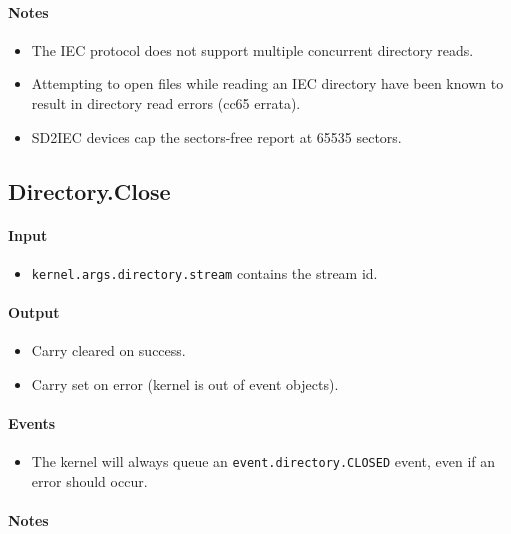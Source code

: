 \paragraph{Notes}

\begin{itemize}
\item The IEC protocol does not support multiple concurrent directory reads.
\item Attempting to open files while reading an IEC directory have been known to result in directory read errors (cc65 errata). 
\item SD2IEC devices cap the sectors-free report at 65535 sectors.
\end{itemize}


\subsection*{Directory.Close}

\paragraph{Input} 

\begin{itemize}
\item \verb+kernel.args.directory.stream+ contains the stream id.
\end{itemize}

\paragraph{Output}

\begin{itemize}
\item Carry cleared on success.
\item Carry set on error (kernel is out of event objects).
\end{itemize}

\paragraph{Events}

\begin{itemize}
\item The kernel will always queue an \verb+event.directory.CLOSED+ event, even if an error should occur.
\end{itemize}

\paragraph{Notes}


